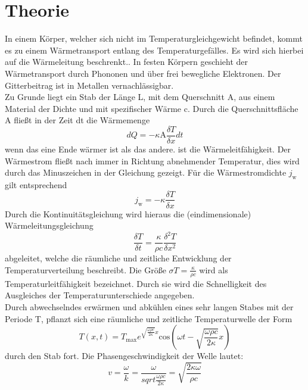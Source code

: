 \section{Theorie}
\label{sec:Theorie}

In einem Körper, welcher sich nicht im Temperaturgleichgewicht befindet, kommt es zu einem Wärmetransport entlang des Temperaturgefälles.
Es wird sich hierbei auf die Wärmeleitung beschrenkt..
In festen Körpern geschieht der Wärmetransport durch Phononen und über frei bewegliche Elektronen.
Der Gitterbeitrag ist in Metallen vernachlässigbar. \\
\noindent
Zu Grunde liegt ein Stab der Länge L, mit dem Querschnitt A, aus einem Material der Dichte \rho und mit spezifischer Wärme c.
Durch die Querschnittsfläche A fließt in der Zeit dt die Wärmemenge
\begin{equation}
  dQ = -\kappa \text{A} \frac{\delta T}{\delta x} dt
  \label{eqn:eqn1}
\end{equation}
wenn das eine Ende wärmer ist als das andere.
\kappa ist die Wärmeleitfähigkeit.
Der Wärmestrom fließt nach immer in Richtung abnehmender Temperatur, dies wird durch das Minuszeichen in der Gleichung gezeigt.
Für die Wärmestromdichte $j_{\text{w}}$ gilt entsprechend
\begin{equation}
  j_{\text{w}} = -\kappa \frac{\delta T}{\delta x}
  \label{eqn:eqn2}
\end{equation}
Durch die Kontinuitätsgleichung wird hieraus die (eindimensionale) Wärmeleitungsgleichung
\begin{equation}
  \frac{\delta T}{\delta t} = \frac{\kappa}{\rho c} \frac{\delta^2 T}{\delta x^2}
  \label{eqn:eqn3}
\end{equation}
abgeleitet, welche die räumliche und zeitliche Entwicklung der Temperaturverteilung beschreibt.
Die Größe $\sigma T = \frac{\kappa}{\rho c}$ wird als Temperaturleitfähigkeit bezeichnet.
Durch sie wird die Schnelligkeit des Ausgleiches der Temperaturunterschiede angegeben.\\
\noindent
Durch abwechselndes erwärmen und abkühlen eines sehr langen Stabes mit der Periode T, pflanzt sich eine räumliche und zeitliche Temperaturwelle der Form
\begin{equation}
  T(x,t) = T_{\text{max}}e^{\sqrt{\frac{\omega \rho c}{2 \kappa}}x} \text{cos} \left ( \omega t - \sqrt{\frac{\omega \rho c}{2 \kappa}}x \right)
  \label{eqn:eqn4}
\end{equation}
durch den Stab fort. 
Die Phasengeschwindigkeit der Welle lautet:
\begin{equation}
  v = \frac{\omega}{k} = \frac{\omega}{sqrt{\frac{\omega \rho c}{2 \kappa}}} = \sqrt{\frac{2 \kappa \omega}{\rho c}}
  \label{eqn:eqn5}
\end{equation}
